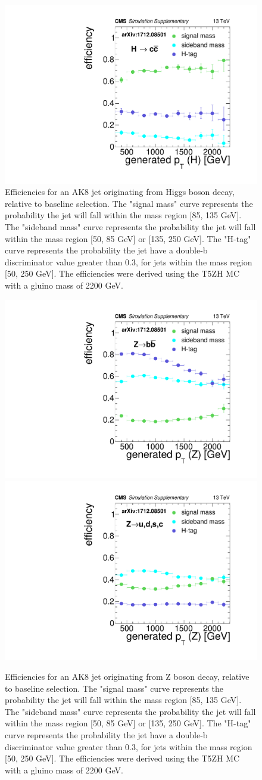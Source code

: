 \begin{figure}[hbp!]
\includegraphics[width=0.45\linewidth]{figs/SUS17006/CMS-SUS-17-006_Figure-aux_010.pdf}
\caption{
Efficiencies for an AK8 jet originating from Higgs boson decay, relative to baseline selection.
The "signal mass" curve represents the probability the jet will fall within the mass region [85, 135 GeV].
The "sideband mass" curve represents the probability the jet will fall within the mass region [50, 85 GeV] or [135, 250 GeV].
The "H-tag" curve represents the probability the jet have a double-b discriminator value greater than 0.3, for jets within the mass region [50, 250 GeV].
The efficiencies were derived using the T5ZH MC with a gluino mass of 2200 GeV.
}
\label{fig:effH}
\end{figure}

\begin{figure}[hbp!]
\centering
\includegraphics[width=0.45\linewidth]{figs/SUS17006/CMS-SUS-17-006_Figure-aux_011.pdf}
\includegraphics[width=0.45\linewidth]{figs/SUS17006/CMS-SUS-17-006_Figure-aux_012.pdf}
\caption{
Efficiencies for an AK8 jet originating from Z boson decay, relative to baseline selection.
The "signal mass" curve represents the probability the jet will fall within the mass region [85, 135 GeV].
The "sideband mass" curve represents the probability the jet will fall within the mass region [50, 85 GeV] or [135, 250 GeV].
The "H-tag" curve represents the probability the jet have a double-b discriminator value greater than 0.3, for jets within the mass region [50, 250 GeV].
The efficiencies were derived using the T5ZH MC with a gluino mass of 2200 GeV.
}
\label{fig:effZ}
\end{figure}

